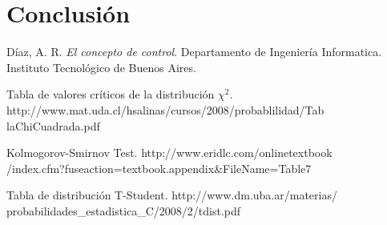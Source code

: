 \documentclass[10pt,journal,compsoc]{IEEEtran}
\begin{document}
\section{Conclusi\'on}






\begin{thebibliography}{1}

D\'iaz, A. R. \emph{El concepto de control}. Departamento de Ingenier\'ia Informatica. 
Instituto Tecnol\'ogico de Buenos Aires.


Tabla de valores cr\'iticos de la distribuci\'on $\chi^2$. http://www.mat.uda.cl/hsalinas/cursos/2008/probablilidad/Tab\\laChiCuadrada.pdf

Kolmogorov-Smirnov Test. http://www.eridlc.com/onlinetextbook\\/index.cfm?fuseaction=textbook.appendix\&FileName=Table7

Tabla de distribuci\'on T-Student. http://www.dm.uba.ar/materias/\\probabilidades\_estadistica\_C/2008/2/tdist.pdf

\end{thebibliography}
\end{document}
